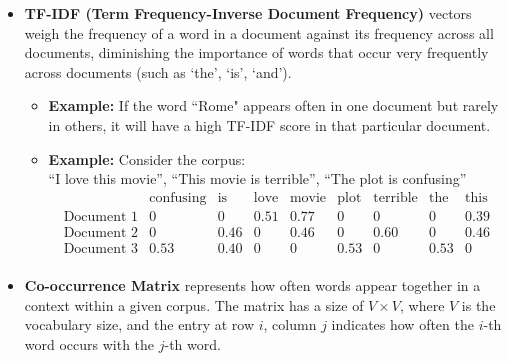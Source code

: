 \begin{itemize}
    \item \textbf{TF-IDF (Term Frequency-Inverse Document Frequency)} vectors weigh the frequency of a word in a document against its frequency across all documents, diminishing the importance of words that occur very frequently across documents (such as `the', `is', `and').
    \begin{itemize}
        \item \textbf{Example:} If the word ``Rome" appears often in one document but rarely in others, it will have a high TF-IDF score in that particular document.
        \item \textbf{Example: } Consider the corpus: \\
        ``I love this movie”,
        ``This movie is terrible”,
        ``The plot is confusing”\\
        \[
\begin{array}{c|cccccccc}
& \text{confusing} & \text{is} & \text{love} & \text{movie} & \text{plot} & \text{terrible} & \text{the} & \text{this} \\
\hline
\text{Document 1} & 0 & 0 & 0.51 & 0.77 & 0 & 0 & 0 & 0.39 \\
\text{Document 2} & 0 & 0.46 & 0 & 0.46 & 0 & 0.60 & 0 & 0.46 \\
\text{Document 3} & 0.53 & 0.40 & 0 & 0 & 0.53 & 0 & 0.53 & 0 \\
\end{array}
\]
        

        
    \end{itemize}

    \item \textbf{Co-occurrence Matrix} represents how often words appear together in a context within a given corpus. The matrix has a size of $V \times V$, where $V$ is the vocabulary size, and the entry at row $i$, column $j$ indicates how often the $i$-th word occurs with the $j$-th word.
    

\end{itemize}
